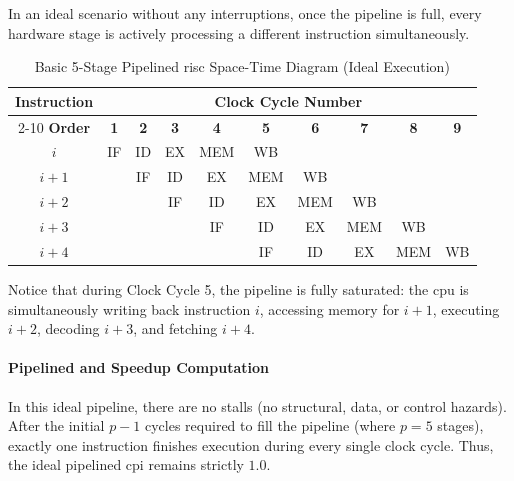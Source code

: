 In an ideal scenario without any interruptions, once the pipeline is full, every hardware stage is actively processing a different instruction simultaneously.

\begin{table}[!htbp]
    \centering
    \renewcommand{\arraystretch}{1.4}
    \begin{tabular}{|c|c|c|c|c|c|c|c|c|c|}
        \hline
        \textbf{Instruction} & \multicolumn{9}{c|}{\textbf{Clock Cycle Number}} \\
        \cline{2-10}
        \textbf{Order} & \textbf{1} & \textbf{2} & \textbf{3} & \textbf{4} & \textbf{5} & \textbf{6} & \textbf{7} & \textbf{8} & \textbf{9} \\
        \hline\hline
        \(i\)     & IF & ID & EX & MEM & WB &    &    &    &    \\
        \hline
        \(i+1\)   &    & IF & ID & EX & MEM & WB &    &    &    \\
        \hline
        \(i+2\)   &    &    & IF & ID & EX & MEM & WB &    &    \\
        \hline
        \(i+3\)   &    &    &    & IF & ID & EX & MEM & WB &    \\
        \hline
        \(i+4\)   &    &    &    &    & IF & ID & EX & MEM & WB \\
        \hline
    \end{tabular}
    \caption{Basic 5-Stage Pipelined \gls{risc} Space-Time Diagram (Ideal Execution)}
    \label{tab:pipeline-diagram}
\end{table}

\noindent Notice that during Clock Cycle 5, the pipeline is fully saturated: the \gls{cpu} is simultaneously writing back instruction \(i\), accessing memory for \(i+1\), executing \(i+2\), decoding \(i+3\), and fetching \(i+4\).

\paragraph{Pipelined  and Speedup Computation}
In this ideal pipeline, there are no stalls (no structural, data, or control hazards). After the initial \(p-1\) cycles required to fill the pipeline (where \(p=5\) stages), exactly one instruction finishes execution during every single clock cycle. Thus, the ideal pipelined \gls{cpi} remains strictly $1.0$.

